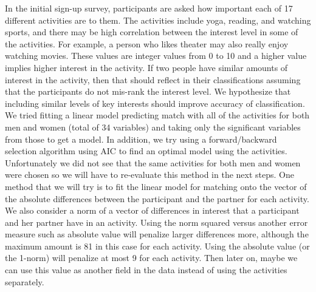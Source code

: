 \documentclass{article}
\begin{document}

In the initial sign-up survey, participants are asked how important each of 17 different activities are to them.  The activities include yoga, reading, and watching sports, and there may be high correlation between the interest level in some of the activities.  For example, a person who likes theater may also really enjoy watching movies.  These values are integer values from 0 to 10 and a higher value implies higher interest in the activity.  If two people have similar amounts of interest in the activity, then that should reflect in their classifications assuming that the participants do not mis-rank the interest level. We hypothesize that including similar levels of key interests should improve accuracy of classification.\\  

We tried fitting a linear model predicting match with all of the activities for both men and women (total of 34 variables) and taking only the significant variables from those to get a model.  In addition, we try using a forward/backward selection algorithm using AIC to find an optimal model using the activities.  Unfortunately we did not see that the same activities for both men and women were chosen so we will have to re-evaluate this method in the next steps.  One method that we will try is to fit the linear model for matching onto the vector of the absolute differences between the participant and the partner for each activity.\\

We also consider a norm of a vector of differences in interest that a participant and her partner have in an activity.  Using the norm squared versus another error measure such as absolute value will penalize larger differences more, although the maximum amount is 81 in this case for each activity. Using the absolute value (or the 1-norm) will penalize at most 9 for each activity. Then later on, maybe we can use this value as another field in the data instead of using the activities separately. \\
\end{document}
